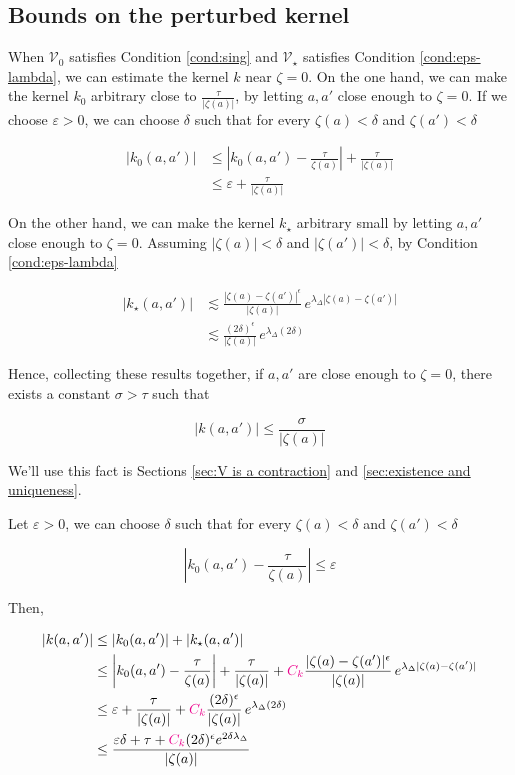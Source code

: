 \documentclass{article}
\theoremstyle{plain}
\newcommand{\hardpart}{\mathcal{V}_0}
\newcommand{\softpart}{\mathcal{V}_\star}
\newcommand{\hardker}{k_0}
\newcommand{\softker}{k_\star}
\begin{document}
\subsection{Bounds on the perturbed kernel}\label{sec:bounds on k}
 When $\hardpart$ satisfies Condition \eqref{cond:sing} and $\softpart$ satisfies Condition \eqref{cond:eps-lambda}, we can estimate the kernel $k$ near $\zeta=0$. On the one hand, we can make the kernel $\hardker$ arbitrary close to $\frac{\tau}{|\zeta(a)|}$, by letting $a,a'$ close enough to $\zeta=0$. If we choose $\varepsilon>0$, we can choose $\delta$ such that for every $\zeta(a)<\delta$ and $\zeta(a') <\delta$

\begin{align*}
    |\hardker(a,a')| &\leq \left\vert\hardker(a,a')-\frac{\tau}{\zeta(a)} \right\vert +\frac{\tau}{|\zeta(a)|}\\
    &\leq \varepsilon +\frac{\tau}{|\zeta(a)|} 
\end{align*}

On the other hand, we can make the kernel $\softker$ arbitrary small by letting $a,a'$ close enough to $\zeta=0$. Assuming $|\zeta(a)|<\delta$ and $|\zeta(a')|<\delta$, by Condition \eqref{cond:eps-lambda}

\begin{align*}
    |\softker(a,a')|&\lesssim\frac{|\zeta(a)-\zeta(a')|^\epsilon}{|\zeta(a)|}\,e^{\lambda_\Delta|\zeta(a)-\zeta(a')|}\\
    &\lesssim\frac{(2\delta)^\epsilon}{|\zeta(a)|}\,e^{\lambda_\Delta (2\delta)}
\end{align*}

Hence, collecting these results together, if $a,a'$ are close enough to $\zeta=0$, there exists a constant $\sigma>\tau$ such that 

\[
    |k(a,a')|\leq \frac{\sigma}{|\zeta(a)|}
\]

We'll use this fact is Sections \ref{sec:V is a contraction} and \ref{sec:existence and uniqueness}. 

 \color{Tomato}
 
 Let $\varepsilon>0$, we can choose $\delta$ such that for every $\zeta(a)<\delta$ and $\zeta(a') <\delta$

\[ \left\vert\hardker(a,a')-\frac{\tau}{\zeta(a)} \right\vert \leq \varepsilon\]

Then, 

\begin{align*}
    |k(a,a')|&\leq |\hardker(a,a')| + |\softker(a,a')|\\
    &\leq \left\vert\hardker(a,a')-\frac{\tau}{\zeta(a)} \right\vert +\frac{\tau}{|\zeta(a)|} +\textcolor{magenta}{C_k}\frac{|\zeta(a)-\zeta(a')|^\epsilon}{|\zeta(a)|}\,e^{\lambda_\Delta|\zeta(a)-\zeta(a')|}\\
    &\leq \varepsilon +\frac{\tau}{|\zeta(a)|} + \textcolor{magenta}{C_k}\frac{(2\delta)^\epsilon}{|\zeta(a)|}\,e^{\lambda_\Delta (2\delta)}\\
    &\leq \frac{\varepsilon\delta+\tau+ \textcolor{magenta}{C_k} (2\delta)^\epsilon e^{2\delta \lambda_\Delta} }{|\zeta(a)|}
\end{align*}
\end{document}
